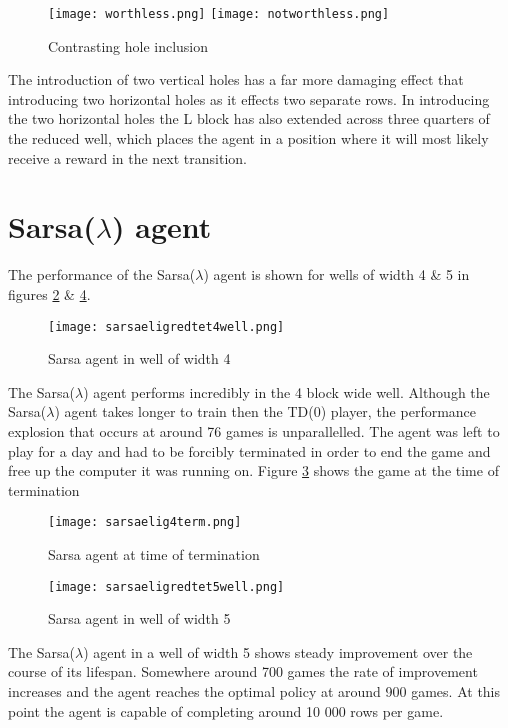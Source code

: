 \documentclass{rucsthesis}
\begin{document}
\begin{figure}[h]
\centering
\texttt{[image: worthless.png]}
\texttt{[image: notworthless.png]}
\caption{Contrasting hole inclusion}
\label{fig:diffholes}
\end{figure}

The introduction of two vertical holes has a far more damaging effect that introducing two horizontal holes as it effects two separate rows. In introducing the two horizontal holes the L block has also extended across three quarters of the reduced well, which places the agent in a position where it will most likely receive a reward in the next transition.

\section{Sarsa($\lambda$) agent}

The performance of the Sarsa($\lambda$) agent is shown for wells of width 4 \& 5 in figures \ref{fig:sarsaeligredtet4well} \& \ref{fig:sarsaeligredtet5well}.

\begin{figure}[h]
\centering
\texttt{[image: sarsaeligredtet4well.png]}
\caption{Sarsa agent in well of width 4}
\label{fig:sarsaeligredtet4well}
\end{figure}

The Sarsa($\lambda$) agent performs incredibly in the 4 block wide well. Although the Sarsa($\lambda$) agent takes longer to train then the TD(0) player, the performance explosion that occurs at around 76 games is unparallelled. The agent was left to play for a day and had to be forcibly terminated in order to end the game and free up the computer it was running on. Figure \ref{fig:sarsaelig4term} shows the game at the time of termination 

\begin{figure}[h]
\centering
\texttt{[image: sarsaelig4term.png]}
\caption{Sarsa agent at time of termination}
\label{fig:sarsaelig4term}
\end{figure}

\begin{figure}[h]
\centering
\texttt{[image: sarsaeligredtet5well.png]}
\caption{Sarsa agent in well of width 5}
\label{fig:sarsaeligredtet5well}
\end{figure}

The Sarsa($\lambda$) agent in a well of width 5 shows steady improvement over the course of its lifespan. Somewhere around 700 games the rate of improvement increases and the agent reaches the optimal policy at around 900 games. At this point the agent is capable of completing around 10 000 rows per game.
\end{document}
